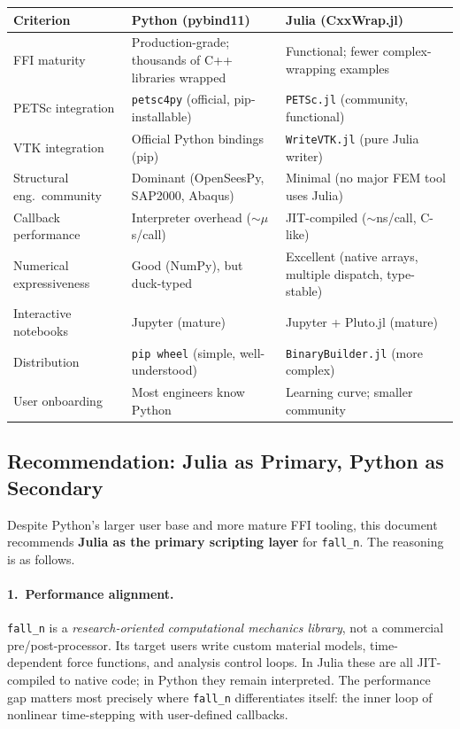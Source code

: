 \begin{center}
\small
\begin{tabular}{p{3.5cm}p{5.5cm}p{5.5cm}}
\toprule
\textbf{Criterion} & \textbf{Python (pybind11)} & \textbf{Julia (CxxWrap.jl)} \\
\midrule
FFI maturity
  & Production-grade; thousands of C++ libraries wrapped
  & Functional; fewer complex-wrapping examples \\
\addlinespace
PETSc integration
  & \texttt{petsc4py} (official, pip-installable)
  & \texttt{PETSc.jl} (community, functional) \\
\addlinespace
VTK integration
  & Official Python bindings (pip)
  & \texttt{WriteVTK.jl} (pure Julia writer) \\
\addlinespace
Structural eng.\ community
  & Dominant (OpenSeesPy, SAP2000, Abaqus)
  & Minimal (no major FEM tool uses Julia) \\
\addlinespace
Callback performance
  & Interpreter overhead ($\sim\mu$s/call)
  & JIT-compiled ($\sim$ns/call, C-like) \\
\addlinespace
Numerical expressiveness
  & Good (NumPy), but duck-typed
  & Excellent (native arrays, multiple dispatch, type-stable) \\
\addlinespace
Interactive notebooks
  & Jupyter (mature)
  & Jupyter + Pluto.jl (mature) \\
\addlinespace
Distribution
  & \texttt{pip wheel} (simple, well-understood)
  & \texttt{BinaryBuilder.jl} (more complex) \\
\addlinespace
User onboarding
  & Most engineers know Python
  & Learning curve; smaller community \\
\bottomrule
\end{tabular}
\end{center}

\subsection{Recommendation: Julia as Primary, Python as Secondary}
\label{sec:scripting-recommendation}

Despite Python's larger user base and more mature FFI tooling,
this document recommends \textbf{Julia as the primary scripting
layer} for \texttt{fall\_n}.  The reasoning is as follows.

\paragraph{1.\ Performance alignment.}
\texttt{fall\_n} is a \emph{research-oriented computational mechanics
library}, not a commercial pre/post-processor.  Its target users write
custom material models, time-dependent force functions, and
analysis control loops.  In Julia these are all JIT-compiled to
native code; in Python they remain interpreted.  The performance
gap matters most precisely where \texttt{fall\_n} differentiates
itself: the inner loop of nonlinear time-stepping with user-defined
callbacks.

